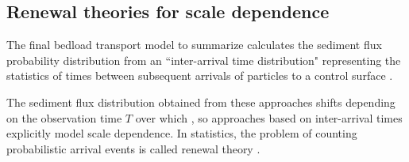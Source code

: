 \subsection{Renewal theories for scale dependence}
\label{sec:renewal}
The final bedload transport model to summarize calculates the sediment flux probability distribution from an ``inter-arrival time distribution" representing the statistics of times between subsequent arrivals of particles to a control surface \citep{Turowski2010, Heyman2013,Ancey2020}.

The sediment flux distribution obtained from these approaches shifts depending on the observation time $T$ over which \DIFdelbegin {}\DIFdelend \DIFaddbegin {}\DIFaddend , so approaches based on inter-arrival times explicitly model scale dependence.
In statistics, the problem of counting probabilistic arrival events is called renewal theory \citep{Cox1962}.

